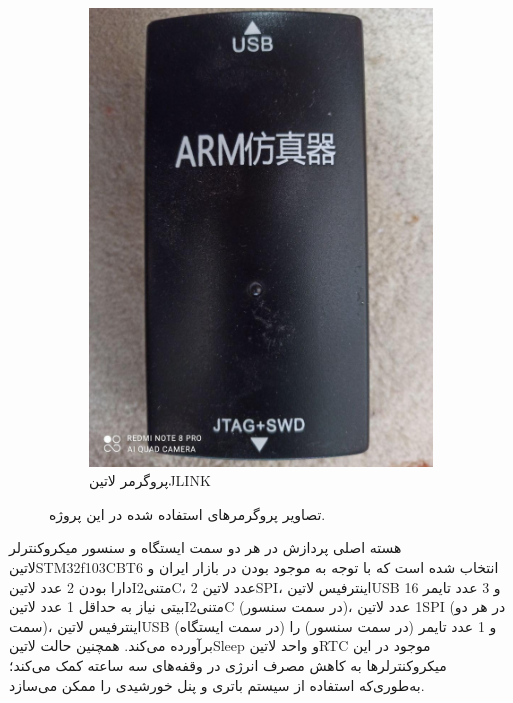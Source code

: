 \begin{figure}[H]
\begin{subfigure}[b]{0.5\textwidth}
		\includegraphics[width=\linewidth]{Assets/jlink.jpg}
		\caption{پروگرمر ‌لاتین{JLINK}}
		\label{fig:jlink}
	\end{subfigure}
	\caption{تصاویر پروگرمر‌های استفاده شده در این پروژه.}
	\label{fig:programmers}
\end{figure}


هسته اصلی پردازش در هر دو سمت ایستگاه و سنسور میکروکنترلر ‌لاتین{STM32f103CBT6} انتخاب شده است که با توجه به موجود بودن در بازار ایران و دارا بودن 2 عدد ‌لاتین{I‌متنی{2}C}، 2 عدد ‌لاتین{SPI}، اینترفیس ‌لاتین{USB} و 3 عدد تایمر 16 بیتی نیاز به حداقل 1 عدد ‌لاتین{I‌متنی{2}C} (در سمت سنسور)، 1 عدد ‌لاتین{SPI} (در هر دو سمت)، اینترفیس ‌لاتین{USB} (در سمت ایستگاه)  و 1 عدد تایمر (در سمت سنسور) را برآورده می‌کند. همچنین حالت ‌لاتین{Sleep} و واحد ‌لاتین{RTC} موجود در این میکروکنترلرها به کاهش مصرف انرژی در وقفه‌های سه ساعته کمک می‌کند؛ به‌طوری‌که استفاده از سیستم باتری و پنل خورشیدی را ممکن می‌سازد.
